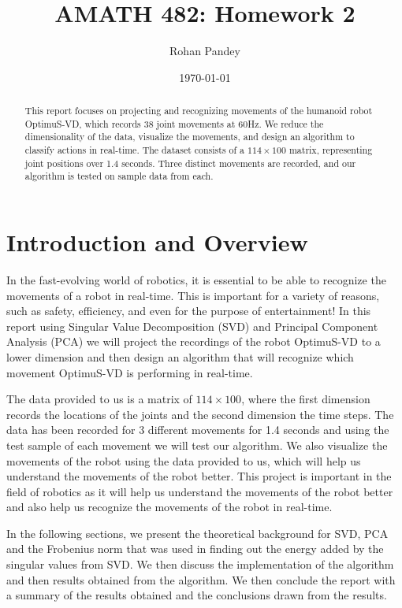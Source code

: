\documentclass[11pt]{amsart}
\title{AMATH 482: Homework 2}
\author{Rohan Pandey} %
\date{\today} %
\begin{document}
\begin{abstract}
    This report focuses on projecting and recognizing movements of the humanoid robot OptimuS-VD, which records 38 joint movements at 60Hz. We reduce the dimensionality of the data, visualize the movements, and design an algorithm to classify actions in real-time. The dataset consists of a $114 \times 100$ matrix, representing joint positions over 1.4 seconds. Three distinct movements are recorded, and our algorithm is tested on sample data from each.
    \end{abstract}

\maketitle

\section{Introduction and Overview}\label{sec:Introduction}


In the fast-evolving world of robotics, it is essential to be able to recognize the movements of a robot in real-time. This is important for a variety of reasons, such as safety, efficiency, and even for the purpose of entertainment! In this report using Singular Value Decomposition (SVD) and Principal Component Analysis (PCA) we will project the recordings of the robot OptimuS-VD to a lower dimension and then design an algorithm that will recognize which movement OptimuS-VD is performing in real-time.

The data provided to us is a matrix of $114\times100$, where the first dimension records the locations of the joints and the second dimension the time steps. The data has been recorded for 3 different movements for 1.4 seconds and using the test sample of each movement we will test our algorithm. We also visualize the movements of the robot using the data provided to us, which will help us understand the movements of the robot better. This project is important in the field of robotics as it will help us understand the movements of the robot better and also help us recognize the movements of the robot in real-time.

In the following sections, we present the theoretical background for SVD, PCA and the Frobenius norm that was used in finding out the energy added by the singular values from SVD. We then discuss the implementation of the algorithm and then results obtained from the algorithm. We then conclude the report with a summary of the results obtained and the conclusions drawn from the results.
\end{document}
